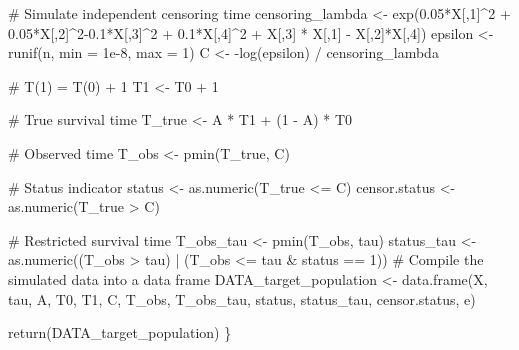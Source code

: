 \documentclass[
  11pt,
  a4paper,
]{article}
\newenvironment{Shaded}{}{}
\newcommand{\AttributeTok}[1]{\textcolor[rgb]{0.84,0.23,0.29}{#1}}
\newcommand{\CommentTok}[1]{\textcolor[rgb]{0.42,0.45,0.49}{#1}}
\newcommand{\DecValTok}[1]{\textcolor[rgb]{0.00,0.36,0.77}{#1}}
\newcommand{\FloatTok}[1]{\textcolor[rgb]{0.00,0.36,0.77}{#1}}
\newcommand{\FunctionTok}[1]{\textcolor[rgb]{0.44,0.26,0.76}{#1}}
\newcommand{\NormalTok}[1]{\textcolor[rgb]{0.14,0.16,0.18}{#1}}
\newcommand{\OtherTok}[1]{\textcolor[rgb]{0.44,0.26,0.76}{#1}}
\newcommand{\SpecialCharTok}[1]{\textcolor[rgb]{0.00,0.36,0.77}{#1}}
\theoremstyle{plain}
\theoremstyle{plain}
\theoremstyle{plain}
\theoremstyle{definition}
\theoremstyle{remark}
\begin{document}
\begin{Shaded}
\begin{Highlighting}[]
  \CommentTok{\# Simulate independent censoring time}
\NormalTok{  censoring\_lambda }\OtherTok{\textless{}{-}} \FunctionTok{exp}\NormalTok{(}\FloatTok{0.05}\SpecialCharTok{*}\NormalTok{X[,}\DecValTok{1}\NormalTok{]}\SpecialCharTok{\^{}}\DecValTok{2} \SpecialCharTok{+} \FloatTok{0.05}\SpecialCharTok{*}\NormalTok{X[,}\DecValTok{2}\NormalTok{]}\SpecialCharTok{\^{}}\DecValTok{2}\FloatTok{{-}0.1}\SpecialCharTok{*}\NormalTok{X[,}\DecValTok{3}\NormalTok{]}\SpecialCharTok{\^{}}\DecValTok{2} \SpecialCharTok{+} \FloatTok{0.1}\SpecialCharTok{*}\NormalTok{X[,}\DecValTok{4}\NormalTok{]}\SpecialCharTok{\^{}}\DecValTok{2} \SpecialCharTok{+} 
\NormalTok{    X[,}\DecValTok{3}\NormalTok{] }\SpecialCharTok{*}\NormalTok{ X[,}\DecValTok{1}\NormalTok{] }\SpecialCharTok{{-}}\NormalTok{ X[,}\DecValTok{2}\NormalTok{]}\SpecialCharTok{*}\NormalTok{X[,}\DecValTok{4}\NormalTok{])}
\NormalTok{  epsilon }\OtherTok{\textless{}{-}} \FunctionTok{runif}\NormalTok{(n, }\AttributeTok{min =} \FloatTok{1e{-}8}\NormalTok{, }\AttributeTok{max =} \DecValTok{1}\NormalTok{)}
\NormalTok{  C }\OtherTok{\textless{}{-}} \SpecialCharTok{{-}}\FunctionTok{log}\NormalTok{(epsilon) }\SpecialCharTok{/}\NormalTok{ censoring\_lambda}
  
  
  \CommentTok{\# T(1) = T(0) + 1}
\NormalTok{  T1 }\OtherTok{\textless{}{-}}\NormalTok{ T0 }\SpecialCharTok{+} \DecValTok{1}
  
  \CommentTok{\# True survival time}
\NormalTok{  T\_true }\OtherTok{\textless{}{-}}\NormalTok{ A }\SpecialCharTok{*}\NormalTok{ T1 }\SpecialCharTok{+}\NormalTok{ (}\DecValTok{1} \SpecialCharTok{{-}}\NormalTok{ A) }\SpecialCharTok{*}\NormalTok{ T0}
  
  \CommentTok{\# Observed time}
\NormalTok{  T\_obs }\OtherTok{\textless{}{-}} \FunctionTok{pmin}\NormalTok{(T\_true, C)}
  
  \CommentTok{\# Status indicator}
\NormalTok{  status }\OtherTok{\textless{}{-}} \FunctionTok{as.numeric}\NormalTok{(T\_true }\SpecialCharTok{\textless{}=}\NormalTok{ C)}
\NormalTok{  censor.status }\OtherTok{\textless{}{-}} \FunctionTok{as.numeric}\NormalTok{(T\_true }\SpecialCharTok{\textgreater{}}\NormalTok{ C)}
  
  \CommentTok{\# Restricted survival time}
\NormalTok{  T\_obs\_tau }\OtherTok{\textless{}{-}} \FunctionTok{pmin}\NormalTok{(T\_obs, tau)}
\NormalTok{  status\_tau }\OtherTok{\textless{}{-}} \FunctionTok{as.numeric}\NormalTok{((T\_obs }\SpecialCharTok{\textgreater{}}\NormalTok{ tau) }\SpecialCharTok{|}\NormalTok{ (T\_obs }\SpecialCharTok{\textless{}=}\NormalTok{ tau }\SpecialCharTok{\&}\NormalTok{ status }\SpecialCharTok{==} \DecValTok{1}\NormalTok{))}
  \CommentTok{\# Compile the simulated data into a data frame}
\NormalTok{  DATA\_target\_population }\OtherTok{\textless{}{-}} \FunctionTok{data.frame}\NormalTok{(X, tau, A, T0, T1, C, T\_obs, T\_obs\_tau, }
\NormalTok{                                       status, status\_tau, censor.status, e)}
  
  \FunctionTok{return}\NormalTok{(DATA\_target\_population)}
\NormalTok{\}}
\end{Highlighting}
\end{Shaded}
\end{document}
